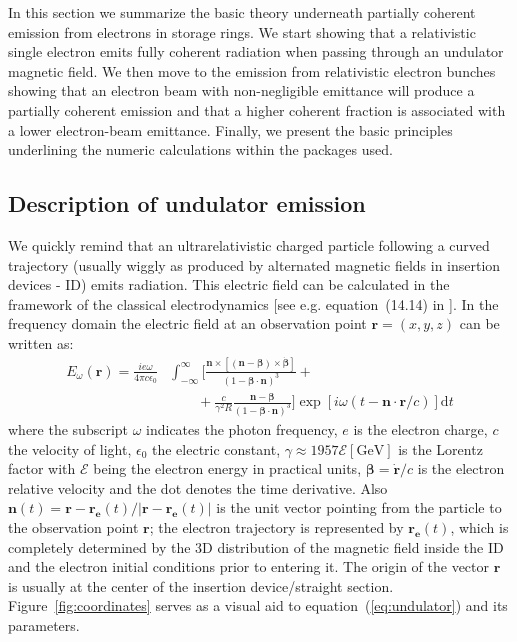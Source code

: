 \documentclass{iucr}              %
\begin{document}
In this section we summarize the basic theory underneath partially coherent emission from electrons in storage rings. We start showing that a relativistic single electron emits fully coherent radiation when passing through an undulator magnetic field. We then move to the emission from relativistic electron bunches showing that an electron beam with non-negligible emittance will produce a partially coherent emission and that a higher coherent fraction is associated with a lower electron-beam emittance. Finally, we present the basic principles underlining the numeric calculations within the packages used.


\subsection{Description of undulator emission}
\label{sec:undulator}

We quickly remind that an ultrarelativistic charged particle following a curved trajectory (usually wiggly as produced by alternated magnetic fields in insertion devices - ID) emits radiation. This electric field can be calculated in the framework of the classical electrodynamics [see e.g. equation~(14.14) in \cite{jackson}]. In the frequency domain the electric field at an observation point $\textbf{r}=(x,y,z)$ can be written as: 
\begin{equation}
\begin{split}
    E_{\omega}(\textbf{r}) = \frac{i e \omega}{4 \pi c \epsilon_0} 
    &\int_{-\infty}^{\infty}
    \biggl[ 
    \frac{\textbf{n} \times [(\textbf{n} - \mathbf{\beta}) \times \dot{\mathbf{\beta}}]}
    {(1- \mathbf{\beta} \cdot \textbf{n})^3} +\\
    &\qquad+\frac{c}{\gamma^2 R}   \frac{\textbf{n} - \mathbf{\beta}}{(1-\mathbf{\beta} \cdot \textbf{n})^3} \biggr]
    \exp[i \omega (t - \textbf{n}\cdot\textbf{r}/c)] \mathrm{d}t
\end{split}\label{eq:undulator}
\end{equation}
where the subscript $\omega$ indicates the photon frequency, $e$ is the electron charge, $c$ the velocity of light, $\epsilon_0$ the electric constant, $\gamma \approx 1957\mathcal{E}[\mathrm{GeV}]$ is the Lorentz factor with $\mathcal{E}$ being the electron energy in practical units, $\mathbf{\beta}=\dot{\mathbf{r}}\big/c$ is the electron relative velocity and the dot denotes the time derivative.
Also $\textbf{n}(t)=\textbf{r}-\textbf{r}_{\textbf{e}}(t)\big/|\textbf{r}-\textbf{r}_{\textbf{e}}(t)|$ is the unit vector pointing from the particle to the observation point $\textbf{r}$; the electron trajectory is represented by $\textbf{r}_{\textbf{e}}(t)$, which is completely determined by the 3D distribution of the magnetic field inside the ID and the electron initial conditions prior to entering it. The origin of the vector $\textbf{r}$ is usually at the center of the insertion device/straight section. Figure~\ref{fig:coordinates} serves as a visual aid to equation~(\ref{eq:undulator}) and its parameters. 
\end{document}
